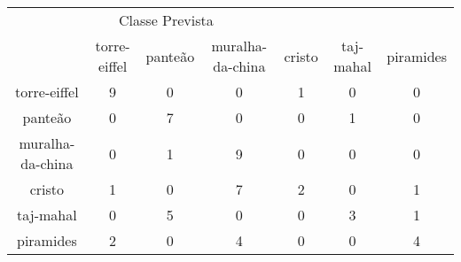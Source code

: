 \begin{tabular}{|c|c|c|c|c|c|c|}
\hline
\multicolumn{5}{|c|}{Classe Prevista}\\
 & torre-eiffel & panteão & muralha-da-china & cristo & taj-mahal & piramides\\
torre-eiffel & 9 & 0 & 0 & 1 & 0 & 0\\
panteão & 0 & 7 & 0 & 0 & 1 & 0\\
muralha-da-china & 0 & 1 & 9 & 0 & 0 & 0\\
cristo & 1 & 0 & 7 & 2 & 0 & 1\\
taj-mahal & 0 & 5 & 0 & 0 & 3 & 1\\
piramides & 2 & 0 & 4 & 0 & 0 & 4\\
\end{tabular}
